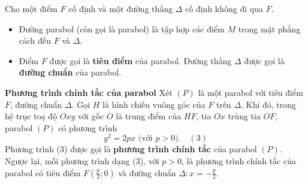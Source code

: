\documentclass[12pt,a4paper]{extarticle}
\begin{document}
Cho một điểm $F$ cố định và một đường thẳng $\Delta$ cố định không đi qua $F$.
\begin{itemize}
    \item Đường parabol (còn gọi là parabol) là tập hợp các điểm $M$ trong mặt phẳng cách đều $F$ và $\Delta$.
    \item Điểm $F$ được gọi là \textbf{tiêu điểm} của parabol. Đường thẳng $\Delta$ được gọi là \textbf{đường chuẩn} của parabol.
\end{itemize}

\begin{center}
\end{center}
\textbf{Phương trình chính tắc của parabol}
Xét $(P)$ là một parabol với tiêu điểm $F$, đường chuẩn $\Delta$. Gọi $H$ là hình chiếu vuông góc của $F$ trên $\Delta$. Khi đó, trong hệ trục toạ độ $Oxy$ với gốc $O$ là trung điểm của $HF$, tia $Ox$ trùng tia $OF$, parabol $(P)$ có phương trình
\[ y^2 = 2px \text{ (với } p > 0). \quad (3) \]
Phương trình (3) được gọi là \textbf{phương trình chính tắc} của parabol $(P)$.
Ngược lại, mỗi phương trình dạng (3), với $p > 0$, là phương trình chính tắc của parabol có tiêu điểm $F\left(\frac{p}{2}; 0\right)$ và đường chuẩn $\Delta: x = -\frac{p}{2}$.\\
\end{document}
